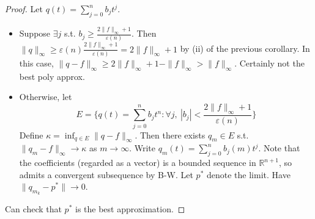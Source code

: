 \documentclass{article}
\theoremstyle{definition}
\theoremstyle{remark}
\theoremstyle{plain}
\newcommand{\RR}{\mathbb{R}}
\begin{document}
\begin{proof}
    Let $q(t)=\sum_{j=0}^nb_jt^j$.
    \begin{itemize}
        \item Suppose $\exists j$ s.t. $b_j\ge\frac{2\|f\|_\infty+1}{\varepsilon(n)}$. Then $\|q\|_\infty\ge\varepsilon(n)\frac{2\|f\|_\infty+1}{\varepsilon(n)}=2\|f\|_\infty+1$ by (ii) of the previous corollary. In this case, $\|q-f\|_\infty\ge2\|f\|_\infty+1-\|f\|_\infty>\|f\|_\infty$. Certainly not the best poly approx.
        \item Otherwise, let $$E=\{q(t)=\sum_{j=0}^nb_jt^n:\forall j,\ |b_j|<\frac{2\|f\|_\infty+1}{\varepsilon(n)}\}$$
        Define $\kappa=\inf_{q\in E}\|q-f\|_\infty$. Then there exists $q_m\in E$ s.t. $\|q_m-f\|_\infty\to\kappa$ as $m\to\infty$. Write $q_m(t)=\sum_{j=0}^nb_j(m)t^j$. Note that the coefficients (regarded as a vector) is a bounded sequence in $\RR^{n+1}$, so admits a convergent subsequence by B-W. Let $p^\ast$ denote the limit. Have $\|q_{m_k}-p^\ast\|\to 0$.
    \end{itemize}
    Can check that $p^\ast$ is the best approximation.
\end{proof}
\end{document}
